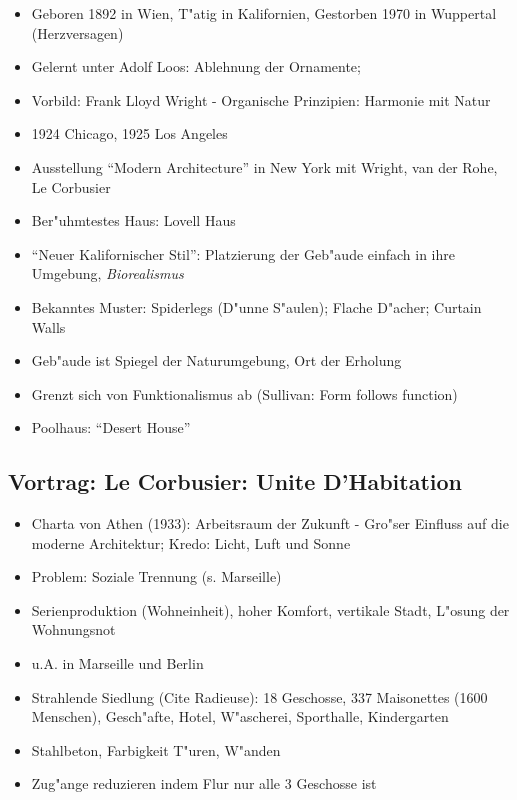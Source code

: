 \documentclass[emulatestandardclasses]{scrartcl}
\begin{document}
\begin{itemize}
  \item Geboren 1892 in Wien, T"atig in Kalifornien, Gestorben 1970 in Wuppertal (Herzversagen)
  \item Gelernt unter Adolf Loos: Ablehnung der Ornamente; 
  \item Vorbild: Frank Lloyd Wright - Organische Prinzipien: Harmonie mit Natur
  \item 1924 Chicago, 1925 Los Angeles
  \item Ausstellung "`Modern Architecture"' in New York mit Wright, van der Rohe, Le Corbusier
  \item Ber"uhmtestes Haus: Lovell Haus
  \item "`Neuer Kalifornischer Stil"': Platzierung der Geb"aude einfach in ihre Umgebung, \emph{Biorealismus}
  \item Bekanntes Muster: Spiderlegs (D"unne S"aulen); Flache D"acher; Curtain Walls
  \item Geb"aude ist Spiegel der Naturumgebung, Ort der Erholung
  \item Grenzt sich von Funktionalismus ab (Sullivan: Form follows function)
  \item Poolhaus: "`Desert House"'
\end{itemize}


\subsection{Vortrag: Le Corbusier: Unite D'Habitation}

\begin{itemize}
  \item Charta von Athen (1933): Arbeitsraum der Zukunft - Gro"ser Einfluss auf die moderne Architektur; Kredo: Licht, Luft und Sonne
  \item Problem: Soziale Trennung (s. Marseille)
  \item Serienproduktion (Wohneinheit), hoher Komfort, vertikale Stadt, L"osung der Wohnungsnot
  \item u.A. in Marseille und Berlin
  \item Strahlende Siedlung (Cite Radieuse): 18 Geschosse, 337 Maisonettes (1600 Menschen), Gesch"afte, Hotel, W"ascherei, Sporthalle, Kindergarten
  \item Stahlbeton, Farbigkeit T"uren, W"anden
  \item Zug"ange reduzieren indem Flur nur alle 3 Geschosse ist
\end{itemize}
\end{document}
